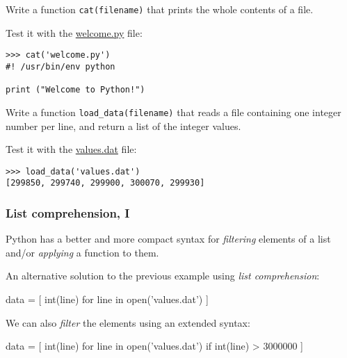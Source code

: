 \documentclass[english,serif,mathserif,xcolor=pdftex,dvipsnames,table]{beamer}
\begin{document}
\begin{frame}[fragile]
  \begin{exercise}
    Write a function \lstinline|cat(filename)| that prints the whole contents of a file.

    \+
    Test it with the
    \href{http://www.gc3.uzh.ch/welcome.py}{welcome.py}
    file:
\begin{lstlisting}
>>> cat('welcome.py')
#! /usr/bin/env python

print ("Welcome to Python!")
\end{lstlisting}
  \end{exercise}

  \+
  \begin{exercise}
    Write a function \lstinline|load_data(filename)| that reads a file
    containing one integer number per line, and return a list of the
    integer values.

    \+
    Test it with the
    \href{http://www.gc3.uzh.ch/values.dat}{values.dat}
    file:
\begin{lstlisting}
>>> load_data('values.dat')
[299850, 299740, 299900, 300070, 299930]
\end{lstlisting}
  \end{exercise}
\end{frame}

\begin{frame}[fragile]
  \frametitle{List comprehension, I}
  Python has a better and more compact syntax for \emph{filtering} elements
  of a list and/or \emph{applying} a function to them.

  \+
  An alternative solution to the previous example using \textit{list
  comprehension}:
  \begin{python}
data = [ int(line) for line in open('values.dat') ]
  \end{python}

  \+
  We can also \textit{filter} the elements using an extended syntax:

  \begin{python}
data = [ int(line) for line in open('values.dat')
         if int(line) > 3000000 ]
  \end{python}
\end{frame}
\end{document}

